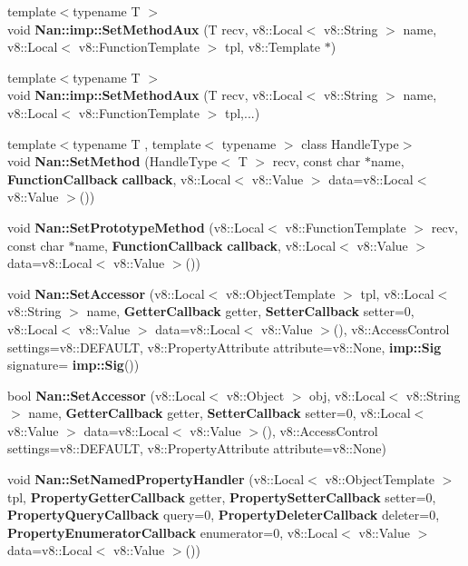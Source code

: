 \begin{DoxyCompactItemize}
{\footnotesize template$<$typename T $>$ }\\void \textbf{ Nan\+::imp\+::\+Set\+Method\+Aux} (T recv, v8\+::\+Local$<$ v8\+::\+String $>$ name, v8\+::\+Local$<$ v8\+::\+Function\+Template $>$ tpl, v8\+::\+Template $\ast$)
\item 
{\footnotesize template$<$typename T $>$ }\\void \textbf{ Nan\+::imp\+::\+Set\+Method\+Aux} (T recv, v8\+::\+Local$<$ v8\+::\+String $>$ name, v8\+::\+Local$<$ v8\+::\+Function\+Template $>$ tpl,...)
\item 
{\footnotesize template$<$typename T , template$<$ typename $>$ class Handle\+Type$>$ }\\void \textbf{ Nan\+::\+Set\+Method} (Handle\+Type$<$ T $>$ recv, const char $\ast$name, \textbf{ Function\+Callback} \textbf{ callback}, v8\+::\+Local$<$ v8\+::\+Value $>$ data=v8\+::\+Local$<$ v8\+::\+Value $>$())
\item 
void \textbf{ Nan\+::\+Set\+Prototype\+Method} (v8\+::\+Local$<$ v8\+::\+Function\+Template $>$ recv, const char $\ast$name, \textbf{ Function\+Callback} \textbf{ callback}, v8\+::\+Local$<$ v8\+::\+Value $>$ data=v8\+::\+Local$<$ v8\+::\+Value $>$())
\item 
void \textbf{ Nan\+::\+Set\+Accessor} (v8\+::\+Local$<$ v8\+::\+Object\+Template $>$ tpl, v8\+::\+Local$<$ v8\+::\+String $>$ name, \textbf{ Getter\+Callback} getter, \textbf{ Setter\+Callback} setter=0, v8\+::\+Local$<$ v8\+::\+Value $>$ data=v8\+::\+Local$<$ v8\+::\+Value $>$(), v8\+::\+Access\+Control settings=v8\+::\+D\+E\+F\+A\+U\+LT, v8\+::\+Property\+Attribute attribute=v8\+::\+None, \textbf{ imp\+::\+Sig} signature=\textbf{ imp\+::\+Sig}())
\item 
bool \textbf{ Nan\+::\+Set\+Accessor} (v8\+::\+Local$<$ v8\+::\+Object $>$ obj, v8\+::\+Local$<$ v8\+::\+String $>$ name, \textbf{ Getter\+Callback} getter, \textbf{ Setter\+Callback} setter=0, v8\+::\+Local$<$ v8\+::\+Value $>$ data=v8\+::\+Local$<$ v8\+::\+Value $>$(), v8\+::\+Access\+Control settings=v8\+::\+D\+E\+F\+A\+U\+LT, v8\+::\+Property\+Attribute attribute=v8\+::\+None)
\item 
void \textbf{ Nan\+::\+Set\+Named\+Property\+Handler} (v8\+::\+Local$<$ v8\+::\+Object\+Template $>$ tpl, \textbf{ Property\+Getter\+Callback} getter, \textbf{ Property\+Setter\+Callback} setter=0, \textbf{ Property\+Query\+Callback} query=0, \textbf{ Property\+Deleter\+Callback} deleter=0, \textbf{ Property\+Enumerator\+Callback} enumerator=0, v8\+::\+Local$<$ v8\+::\+Value $>$ data=v8\+::\+Local$<$ v8\+::\+Value $>$())

\end{DoxyCompactItemize}
